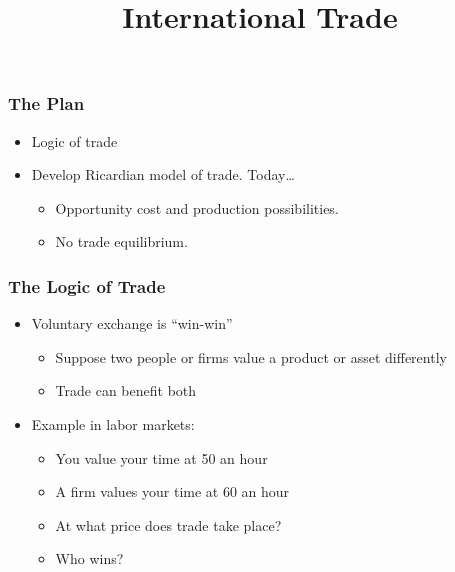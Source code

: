 \documentclass[handout]{beamer}
\title[NYU Stern] %
{\Large International Trade}
\author[Michael Waugh] %
{\bf{\Large}}%
\date[] %
\begin{document}
\begin{frame}
  \titlepage
\end{frame}

\begin{frame}[t]
\frametitle{The Plan}
\bigskip
\begin{itemize}
\item Logic of trade
\bigskip
\item Develop Ricardian model of trade. Today\ldots
\begin{itemize}
\medskip
\item Opportunity cost and production possibilities.
\medskip
\item No trade equilibrium.
\medskip
\end{itemize}
\end{itemize}
\end{frame}


\begin{frame}[t]
\frametitle{The Logic of Trade}
\bigskip
\begin{itemize}
\item Voluntary exchange is ``win-win''
\begin{itemize}
\medskip
\item Suppose two people or firms value a product or asset differently
\medskip
\item Trade can benefit both
\end{itemize}
\bigskip
\item Example in labor markets:
\begin{itemize}
\medskip
\item You value your time at 50 an hour
\medskip
\item A firm values your time at 60 an hour
\medskip
\item At what price does trade take place?
\medskip
\item Who wins?
\end{itemize}
\end{itemize}
\bigskip
\end{frame}

\end{document}
